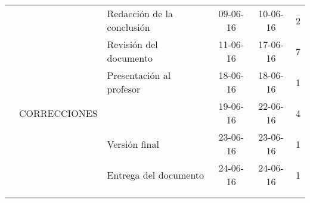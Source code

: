 \begin{table}[H]
{\begin{tabular}{lllccc}
     &                               & Redacción de la conclusión                         & 09-06-16                                                           & 10-06-16                                                            & 2                                                                  \\
     &                               & Revisión del documento                             & 11-06-16                                                           & 17-06-16                                                            & 7                                                                  \\
     &                               & Presentación al profesor                           & 18-06-16                                                           & 18-06-16                                                            & 1                                                                  \\ \hline
     & CORRECCIONES                  &                                                    & 19-06-16                                                           & 22-06-16                                                            & 4                                                                  \\
     &                               & Versión final                                      & 23-06-16                                                           & 23-06-16                                                            & 1                                                                  \\
     &                               & Entrega del documento                              & 24-06-16                                                           & 24-06-16                                                            & 1                                                                  \\ \hline
     &                               &                                                    & \multicolumn{1}{l}{}                                               & \multicolumn{1}{l}{}                                                & \multicolumn{1}{l}{}                                               \\
     &                               &                                                    & \multicolumn{1}{l}{}                                               & \multicolumn{1}{l}{}                                                & \multicolumn{1}{l}{}
\end{tabular}
}
\end{table}
